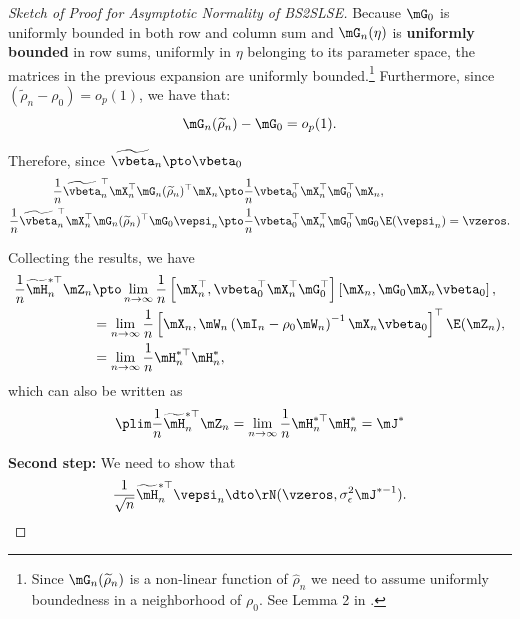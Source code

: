 \documentclass[english,12pt]{book}\usepackage[]{graphicx}\usepackage[]{xcolor}
\begin{document}
\begin{proof}[Sketch of Proof for Asymptotic Normality of BS2SLSE]
Because $\mG_0$ is uniformly bounded in both row and column sum and $\mG_n(\eta)$ is \textbf{uniformly bounded} in row sums, uniformly in $\eta$ belonging to its parameter space, the matrices in the previous expansion are uniformly bounded.\footnote{Since $\mG_n(\widetilde{\rho}_n)$ is a non-linear function of $\widehat{\rho}_n$ we need to assume uniformly boundedness in a neighborhood of $\rho_0$. See Lemma 2 in \cite{lee2003best}.} Furthermore, since $\left(\widetilde{\rho}_n - \rho_0\right) = o_p(1)$, we have that:
\begin{equation*}
\mG_n(\widetilde{\rho}_n) -  \mG_0  = o_p(1).
\end{equation*}

Therefore, since $\widetilde{\vbeta}_n\pto \vbeta_0$
\begin{equation*}
\begin{aligned}
\frac{1}{n}\widetilde{\vbeta}^\top_n\mX_n^\top \mG_n(\widetilde{\rho}_n)^\top\mX_n & \pto \frac{1}{n}\vbeta_0^\top\mX_n^\top \mG_0^\top\mX_n, \\
\frac{1}{n}\widetilde{\vbeta}^\top_n\mX_n^\top \mG_n(\widetilde{\rho}_n)^\top\mG_0\vepsi_n & \pto \frac{1}{n}\vbeta_0^\top\mX_n^\top \mG_0^\top\mG_0\E(\vepsi_n) = \vzeros.
\end{aligned}
\end{equation*}

Collecting the results, we have
\begin{equation*}
\begin{aligned}
  \frac{1}{n}\widetilde{\mH}^{*\top}_n \mZ_n & \pto \lim_{n \to \infty}\frac{1}{n}\left[ \mX_n^\top,  \vbeta_0^\top\mX_n^\top\mG_0^\top\right] \left[\mX_n, \mG_0\mX_n\vbeta_0\right], \\
   & = \lim_{n \to \infty}\frac{1}{n}\left[\mX_n, \mW_n\left(\mI_n - \rho_0\mW_n\right)^{-1}\mX_n\vbeta_0\right]^\top\E(\mZ_n), \\
   & = \lim_{n \to \infty} \frac{1}{n}\mH^{*\top}_n\mH^{*}_n,
  \end{aligned}
\end{equation*}
%
which can also be written as
\begin{equation*}
\plim \frac{1}{n}\widetilde{\mH}^{*\top}_n \mZ_n  = \lim_{n \to \infty} \frac{1}{n}\mH^{*\top}_n\mH^{*}_n = \mJ^*
\end{equation*}


\textbf{Second step:} We need to show that
\begin{equation*}
\frac{1}{\sqrt{n}}\widetilde{\mH}_n^{*\top}\vepsi_n \dto \rN(\vzeros, \sigma_{\epsilon}^2\mJ^{*-1}). 
\end{equation*}


\end{proof}
\end{document}
